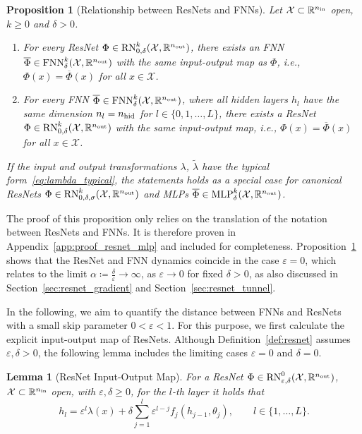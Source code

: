 \documentclass[10pt]{article}
\newtheorem{proposition}[theorem]{Proposition}
\newtheorem{lemma}[theorem]{Lemma}
\theoremstyle{definition}
\numberwithin{equation}{section}
\newcommand{\eps}{\varepsilon}
\newcommand{\R}{\mathbb{R}}
\newcommand*{\nout}{n_\textup{out}}
\newcommand*{\nhid}{n_\textup{hid}}
\newcommand*{\nin}{n_\textup{in}}
\newcommand*{\MLP}{\textup{MLP}_{\delta}^k(\mathcal{X},\R^{\nout})}
\newcommand*{\FNN}{\textup{FNN}_{\delta}^k(\mathcal{X},\R^{\nout})}
\begin{document}
	
\begin{proposition}[Relationship between ResNets and FNNs] \label{prop:resnet_mlp}
	Let $\mathcal{X}\subset \R^{\nin}$ open, $k\geq 0$ and $\delta>0$. 
	\begin{enumerate}[label=(\alph*), font=\normalfont]
		\item \label{prop:resnet_mlp_a} For every ResNet $\Phi \in \textup{RN}_{0,\delta}^k(\mathcal{X},\R^{\nout})$, there exists an FNN $\overline{\Phi} \in \FNN$ with the same input-output map as $\Phi$, i.e., $\Phi(x) = \overline{\Phi}(x)$ for all $x \in \mathcal{X}$.
		\item \label{prop:resnet_mlp_b} For every FNN $\overline{\Phi} \in \FNN$, where all hidden layers $h_l$ have the same dimension $n_l = \nhid $ for $l \in \{0,1,\ldots,L\}$, there exists a ResNet $\Phi \in \textup{RN}_{0,\delta}^k(\mathcal{X},\R^{\nout})$ with the same input-output map, i.e., $\Phi(x) = \overline{\Phi}(x)$ for all $x \in \mathcal{X}$.
	\end{enumerate}
    If the input and output transformations $\lambda$, $\tilde{\lambda}$ have the typical form~\eqref{eq:lambda_typical}, the statements holds as a special case for canonical ResNets $\Phi \in \textup{RN}_{0,\delta,\sigma}^k(\mathcal{X},\R^{\nout})$ and MLPs $\overline{\Phi}\in\MLP$.
\end{proposition}

The proof of this proposition only relies on the translation of the notation between ResNets and FNNs. It is therefore proven in Appendix~\ref{app:proof_resnet_mlp} and included for completeness. Proposition~\ref{prop:resnet_mlp} shows that the ResNet and FNN dynamics coincide in the case $\eps = 0$, which relates to the limit $\alpha \coloneqq \frac{\delta}{\eps} \rightarrow \infty$, as $\eps \rightarrow 0$ for fixed $\delta>0$, as also discussed in Section~\ref{sec:resnet_gradient} and Section~\ref{sec:resnet_tunnel}. \medskip

In the following, we aim to quantify the distance between FNNs and ResNets with a small skip parameter $0< \eps < 1$. For this purpose, we first calculate the explicit input-output map of ResNets. Although Definition~\ref{def:resnet} assumes $\eps,\delta>0$, the following lemma includes the limiting cases $\eps = 0$ and $\delta = 0$.

\begin{lemma}[ResNet Input-Output Map]\label{lem:resnet_inputoutput}
	For a ResNet $\Phi \in \textup{RN}^0_{\eps,\delta}(\mathcal{X},\R^{\nout})$, $\mathcal{X}\subset \R^{\nin}$ open, with $\eps,\delta \geq 0$, for the $l$-th layer it holds that
    \begin{equation}\label{eq:inputoutput}
        h_l = \eps^l \lambda(x) + \delta \sum_{j = 1}^{l} \eps^{l-j}f_j(h_{j-1},\theta_j), \qquad l \in \{1,\ldots,L\}.
    \end{equation}
\end{lemma}
\end{document}
